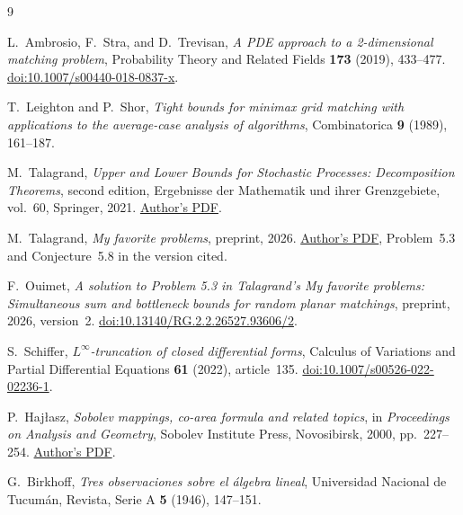 \documentclass[11pt]{article}
\theoremstyle{remark}
\numberwithin{equation}{section}
\begin{document}
\begin{thebibliography}{9}

L.~Ambrosio, F.~Stra, and D.~Trevisan,
\emph{A PDE approach to a 2-dimensional matching problem},
Probability Theory and Related Fields \textbf{173} (2019), 433--477.
\href{https://doi.org/10.1007/s00440-018-0837-x}{doi:10.1007/s00440-018-0837-x}.

T.~Leighton and P.~Shor,
\emph{Tight bounds for minimax grid matching with applications to the
average-case analysis of algorithms},
Combinatorica \textbf{9} (1989), 161--187.

M.~Talagrand,
\emph{Upper and Lower Bounds for Stochastic Processes:
Decomposition Theorems}, second edition,
Ergebnisse der Mathematik und ihrer Grenzgebiete, vol.~60,
Springer, 2021.
\href{https://michel.talagrand.net/ULBSPRINGER.pdf}{Author's PDF}.

M.~Talagrand,
\emph{My favorite problems}, preprint, 2026.
\href{https://michel.talagrand.net/Korea15.pdf}{Author's PDF},
Problem~5.3 and Conjecture~5.8 in the version cited.

F.~Ouimet,
\emph{A solution to Problem 5.3 in Talagrand's My favorite problems:
Simultaneous sum and bottleneck bounds for random planar matchings},
preprint, 2026, version~2.
\href{https://doi.org/10.13140/RG.2.2.26527.93606/2}{doi:10.13140/RG.2.2.26527.93606/2}.

S.~Schiffer,
\emph{\(L^\infty\)-truncation of closed differential forms},
Calculus of Variations and Partial Differential Equations
\textbf{61} (2022), article~135.
\href{https://doi.org/10.1007/s00526-022-02236-1}{doi:10.1007/s00526-022-02236-1}.

P.~Haj{\l}asz,
\emph{Sobolev mappings, co-area formula and related topics},
in \emph{Proceedings on Analysis and Geometry},
Sobolev Institute Press, Novosibirsk, 2000, pp.~227--254.
\href{https://sites.pitt.edu/~hajlasz/OriginalPublications/Hajlasz-Sobolev-ProceedingsOnAnalysisAndGeometry-2000-227-254.pdf}{Author's PDF}.

G.~Birkhoff,
\emph{Tres observaciones sobre el \'algebra lineal},
Universidad Nacional de Tucum\'an, Revista, Serie A
\textbf{5} (1946), 147--151.

\end{thebibliography}
\end{document}
